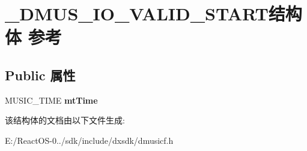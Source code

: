 \hypertarget{struct___d_m_u_s___i_o___v_a_l_i_d___s_t_a_r_t}{}\section{\+\_\+\+D\+M\+U\+S\+\_\+\+I\+O\+\_\+\+V\+A\+L\+I\+D\+\_\+\+S\+T\+A\+R\+T结构体 参考}
\label{struct___d_m_u_s___i_o___v_a_l_i_d___s_t_a_r_t}
\subsection*{Public 属性}
\begin{DoxyCompactItemize}
\item 
\mbox{\label{struct___d_m_u_s___i_o___v_a_l_i_d___s_t_a_r_t_a804b7732f1f5e4e45c14cdbe223b23c3}} 
M\+U\+S\+I\+C\+\_\+\+T\+I\+ME {\bfseries mt\+Time}
\end{DoxyCompactItemize}


该结构体的文档由以下文件生成\+:\begin{DoxyCompactItemize}
\item 
E\+:/\+React\+O\+S-\/0../sdk/include/dxsdk/dmusicf.\+h\end{DoxyCompactItemize}
